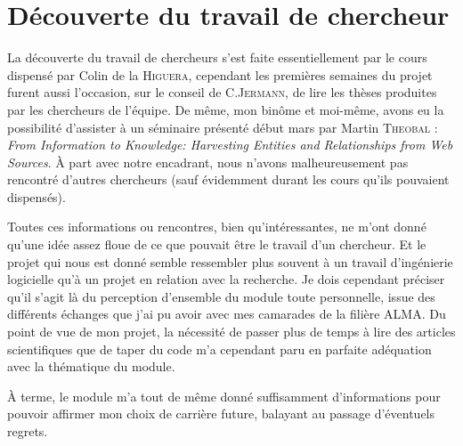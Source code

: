 \documentclass[12pt,a4paper,utf8x,titlepage]{article}
\begin{document}
\clearpage
\section{Découverte du travail de chercheur}
La découverte du travail de chercheurs s'est faite essentiellement par le cours dispensé par Colin de la \textsc{Higuera}, cependant les premières semaines du projet furent aussi l'occasion, sur le conseil de C.\textsc{Jermann}, de lire les thèses produites par les chercheurs de l'équipe. De même, mon binôme et moi-même, avons eu la possibilité d'assister à un séminaire présenté début mars par Martin \textsc{Theobal} : \og \emph{From Information to Knowledge: Harvesting Entities and Relationships from Web Sources}\fg{}. À part avec notre encadrant, nous n'avons malheureusement pas rencontré d'autres chercheurs (sauf évidemment durant les cours qu'ils pouvaient dispensés).

Toutes ces informations ou rencontres, bien qu'intéressantes, ne m'ont donné qu'une idée assez floue de ce que pouvait être le travail d'un chercheur. Et le projet qui nous est donné semble ressembler plus souvent à un travail d'ingénierie logicielle qu'à un projet en relation avec la recherche. Je dois cependant préciser qu'il s'agit là du perception d'ensemble du module toute personnelle, issue des différents échanges que j'ai pu avoir avec mes camarades de la filière ALMA. Du point de vue de mon projet, la nécessité de passer plus de temps à lire des articles scientifiques que de taper du code m'a cependant paru en parfaite adéquation avec la thématique du module.

À terme, le module m'a tout de même donné suffisamment d'informations pour pouvoir affirmer mon choix de carrière future, balayant au passage d'éventuels regrets.


\clearpage



\end{document}
